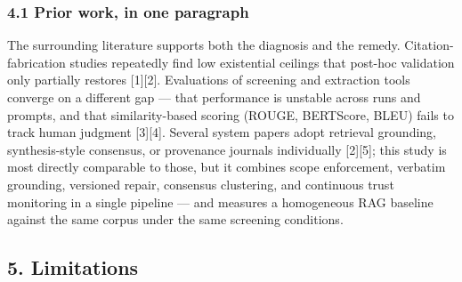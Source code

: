 \documentclass[11pt]{article}
\begin{document}
\subsubsection{4.1 Prior work, in one
paragraph}\label{prior-work-in-one-paragraph}

The surrounding literature supports both the diagnosis and the remedy.
Citation-fabrication studies repeatedly find low existential ceilings
that post-hoc validation only partially restores {[}1{]}{[}2{]}.
Evaluations of screening and extraction tools converge on a different
gap --- that performance is unstable across runs and prompts, and that
similarity-based scoring (ROUGE, BERTScore, BLEU) fails to track human
judgment {[}3{]}{[}4{]}. Several system papers adopt retrieval
grounding, synthesis-style consensus, or provenance journals
individually {[}2{]}{[}5{]}; this study is most directly comparable to
those, but it combines scope enforcement, verbatim grounding, versioned
repair, consensus clustering, and continuous trust monitoring in a
single pipeline --- and measures a homogeneous RAG baseline against the
same corpus under the same screening conditions.

\subsection{5. Limitations}\label{limitations}
\end{document}
